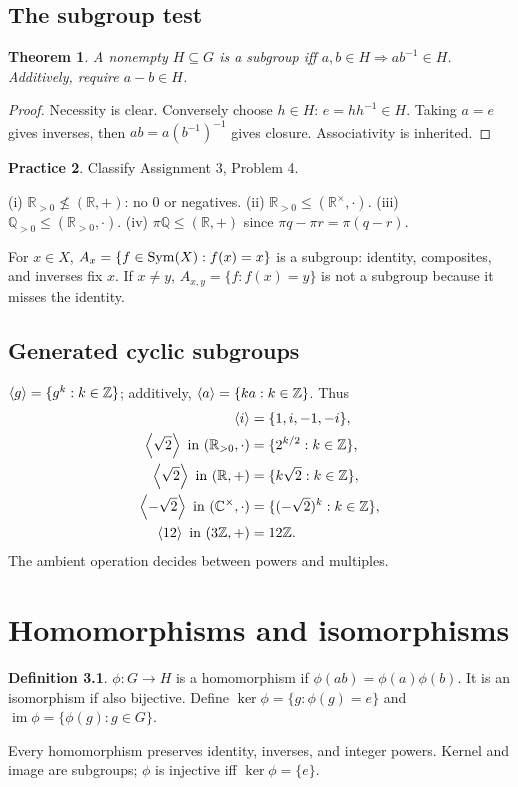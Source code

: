 \documentclass[11pt,openany]{book}
\newcommand{\Q}{\mathbb Q}\newcommand{\R}{\mathbb R}
\newcommand{\C}{\mathbb C}\newcommand{\PP}{\mathcal P}
\newcommand{\angles}[1]{\left\langle#1\right\rangle}
\newtheorem{theorem}{Theorem}[chapter]
\theoremstyle{definition}
\newtheorem{definition}[theorem]{Definition}
\newtheorem{exercise}[theorem]{Practice}
\begin{document}
\section{The subgroup test}
\begin{theorem}A nonempty $H\subseteq G$ is a subgroup iff $a,b\in H\Rightarrow ab^{-1}\in H$. Additively, require $a-b\in H$.\end{theorem}
\begin{proof}Necessity is clear. Conversely choose $h\in H$: $e=hh^{-1}\in H$. Taking $a=e$ gives inverses, then $ab=a(b^{-1})^{-1}$ gives closure. Associativity is inherited.\end{proof}
\begin{exercise}Classify Assignment 3, Problem 4.\end{exercise}
\begin{solution}
(i) $\R_{>0}\not\le(\R,+)$: no $0$ or negatives. (ii) $\R_{>0}\le(\R^\times,\cdot)$. (iii) $\Q_{>0}\le(\R_{>0},\cdot)$. (iv) $\pi\Q\le(\R,+)$ since $\pi q-\pi r=\pi(q-r)$.
\end{solution}

For $x\in X$, $A_x=\{f\in\operatorname{Sym}(X):f(x)=x\}$ is a subgroup: identity, composites, and inverses fix $x$. If $x\ne y$, $A_{x,y}=\{f:f(x)=y\}$ is not a subgroup because it misses the identity.

\section{Generated cyclic subgroups}
$\angles g=\{g^k:k\in\Z\}$; additively, $\angles a=\{ka:k\in\Z\}$. Thus
\begin{align*}
\angles i&=\{1,i,-1,-i\},\\
\angles{\sqrt2}\text{ in }(\R_{>0},\cdot)&=\{2^{k/2}:k\in\Z\},\\
\angles{\sqrt2}\text{ in }(\R,+)&=\{k\sqrt2:k\in\Z\},\\
\angles{-\sqrt2}\text{ in }(\C^\times,\cdot)&=\{(-\sqrt2)^k:k\in\Z\},\\
\angles{12}\text{ in }(3\Z,+)&=12\Z.
\end{align*}
The ambient operation decides between powers and multiples.


\chapter{Homomorphisms and isomorphisms}
\begin{definition}$\phi:G\to H$ is a homomorphism if $\phi(ab)=\phi(a)\phi(b)$. It is an isomorphism if also bijective. Define $\ker\phi=\{g:\phi(g)=e\}$ and $\operatorname{im}\phi=\{\phi(g):g\in G\}$.\end{definition}
Every homomorphism preserves identity, inverses, and integer powers. Kernel and image are subgroups; $\phi$ is injective iff $\ker\phi=\{e\}$.
\end{document}

